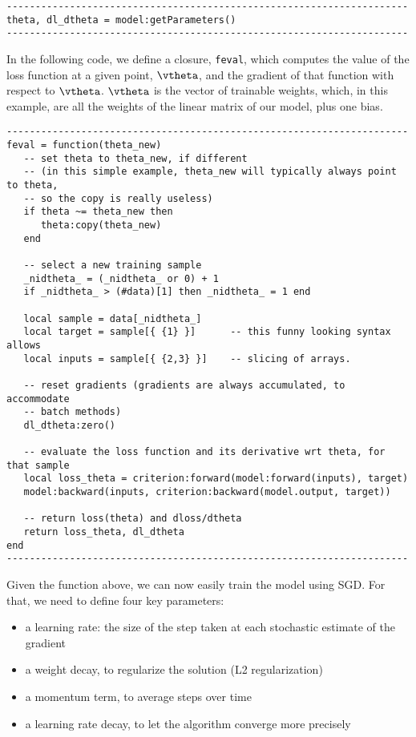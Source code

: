\begin{verbatim}
----------------------------------------------------------------------
theta, dl_dtheta = model:getParameters() 
----------------------------------------------------------------------
\end{verbatim}

In the following code, we define a closure, {\tt feval}, which computes
the value of the loss function at a given point, $ \vtheta$, and the gradient of
that function with respect to $\vtheta$. $\vtheta$ is the vector of trainable weights,
which, in this example, are all the weights of the linear matrix of
our model, plus one bias.

\begin{verbatim}
----------------------------------------------------------------------
feval = function(theta_new)
   -- set theta to theta_new, if different
   -- (in this simple example, theta_new will typically always point to theta,
   -- so the copy is really useless)
   if theta ~= theta_new then
      theta:copy(theta_new)
   end

   -- select a new training sample
   _nidtheta_ = (_nidtheta_ or 0) + 1
   if _nidtheta_ > (#data)[1] then _nidtheta_ = 1 end

   local sample = data[_nidtheta_]
   local target = sample[{ {1} }]      -- this funny looking syntax allows
   local inputs = sample[{ {2,3} }]    -- slicing of arrays.

   -- reset gradients (gradients are always accumulated, to accommodate 
   -- batch methods)
   dl_dtheta:zero()

   -- evaluate the loss function and its derivative wrt theta, for that sample
   local loss_theta = criterion:forward(model:forward(inputs), target)
   model:backward(inputs, criterion:backward(model.output, target))

   -- return loss(theta) and dloss/dtheta
   return loss_theta, dl_dtheta
end
----------------------------------------------------------------------
\end{verbatim}

Given the function above, we can now easily train the model using SGD.
For that, we need to define four key parameters:

\begin{itemize}
\item  a learning rate: the size of the step taken at each stochastic estimate of the gradient
\item a weight decay, to regularize the solution (L2 regularization)
\item a momentum term, to average steps over time
\item a learning rate decay, to let the algorithm converge more precisely
\end{itemize}

